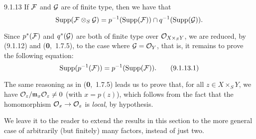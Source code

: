 \documentclass[../main.tex]{subfiles}
\begin{document}
\begin{env}[Corollary]{9.1.13}
    If $\mathcal{F}$ and $\mathcal{G}$ are of finite type, then we have that
    \begin{equation*}
        \operatorname{Supp}(\mathcal{F}\otimes_S\mathcal{G}) = p^{-1}(\operatorname{Supp}(\mathcal{F}))\cap q^{-1}(\operatorname{Supp}(\mathcal{G})).
    \end{equation*}
\end{env}

Since $p^*(\mathcal{F})$ and $q^*(\mathcal{G})$ are both of finite type over $\mathcal{O}_{X\times_S Y}$, we are reduced, by (9.1.12) and (\textbf{0},~1.7.5), to the case where $\mathcal{G}=\mathcal{O}_Y$, that is, it remains to prove the following equation:
\begin{equation*}
    \operatorname{Supp}(p^{-1}(\mathcal{F})) = p^{-1}(\operatorname{Supp}(\mathcal{F})).\tag{9.1.13.1}
\end{equation*}

The same reasoning as in (\textbf{0},~1.7.5) leads us to prove that, for all $z\in X\times_S Y$, we have $\mathcal{O}_z/\mathfrak{m}_x\mathcal{O}_z\neq0$ (with $x=p(z)$), which follows from the fact that the homomorphism $\mathcal{O}_x\to\mathcal{O}_z$ is \emph{local}, by hypothesis.

We leave it to the reader to extend the results in this section to the more general case of arbitrarily (but finitely) many factors, instead of just two.
\end{document}
